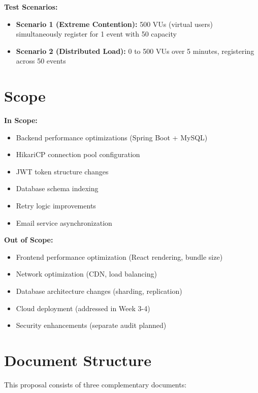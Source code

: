 \documentclass[12pt,a4paper,oneside]{report}
\begin{document}
\textbf{Test Scenarios:}
\begin{itemize}[leftmargin=1.5em,topsep=0.3em,itemsep=0.2em]
    \item \textbf{Scenario 1 (Extreme Contention):} 500 VUs (virtual users) simultaneously register for 1 event with 50 capacity
    \item \textbf{Scenario 2 (Distributed Load):} 0 to 500 VUs over 5 minutes, registering across 50 events
\end{itemize}

\section{Scope}

\textbf{In Scope:}
\begin{itemize}[leftmargin=1.5em,topsep=0.3em,itemsep=0.2em]
    \item Backend performance optimizations (Spring Boot + MySQL)
    \item HikariCP connection pool configuration
    \item JWT token structure changes
    \item Database schema indexing
    \item Retry logic improvements
    \item Email service asynchronization
\end{itemize}

\textbf{Out of Scope:}
\begin{itemize}[leftmargin=1.5em,topsep=0.3em,itemsep=0.2em]
    \item Frontend performance optimization (React rendering, bundle size)
    \item Network optimization (CDN, load balancing)
    \item Database architecture changes (sharding, replication)
    \item Cloud deployment (addressed in Week 3-4)
    \item Security enhancements (separate audit planned)
\end{itemize}

\section{Document Structure}

This proposal consists of three complementary documents:
\end{document}
